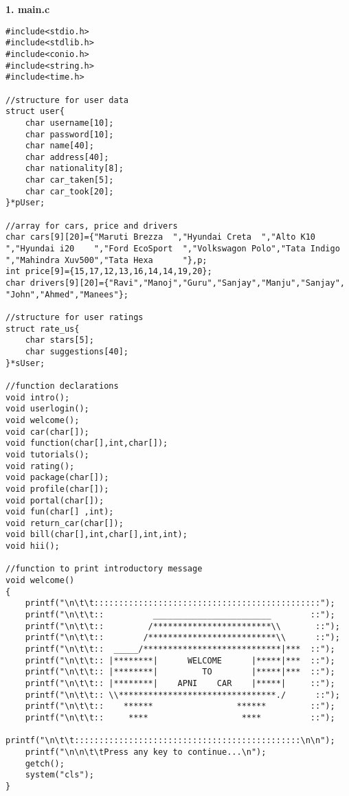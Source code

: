 \documentclass[12pt]{article}
\begin{document}
\noindent \textbf{1. main.c}


\begin{lstlisting} 
#include<stdio.h>
#include<stdlib.h>
#include<conio.h>
#include<string.h>
#include<time.h>

//structure for user data
struct user{
    char username[10];
    char password[10];
    char name[40];
    char address[40];
    char nationality[8];
    char car_taken[5];
    char car_took[20];
}*pUser;

//array for cars, price and drivers
char cars[9][20]={"Maruti Brezza  ","Hyundai Creta  ","Alto K10       ","Hyundai i20    ","Ford EcoSport  ","Volkswagon Polo","Tata Indigo    ","Mahindra Xuv500","Tata Hexa      "},p;
int price[9]={15,17,12,13,16,14,14,19,20};
char drivers[9][20]={"Ravi","Manoj","Guru","Sanjay","Manju","Sanjay",
"John","Ahmed","Manees"};

//structure for user ratings
struct rate_us{
    char stars[5];
    char suggestions[40];
}*sUser;

//function declarations
void intro();
void userlogin();
void welcome();
void car(char[]);
void function(char[],int,char[]);
void tutorials();
void rating();
void package(char[]);
void profile(char[]);
void portal(char[]);
void fun(char[] ,int);
void return_car(char[]);
void bill(char[],int,char[],int,int);
void hii();

//function to print introductory message
void welcome()
{
	printf("\n\t\t::::::::::::::::::::::::::::::::::::::::::::::");
   	printf("\n\t\t::          ________________________        ::");
   	printf("\n\t\t::         /************************\\       ::");
   	printf("\n\t\t::        /**************************\\      ::");
   	printf("\n\t\t::  _____/****************************|***  ::");
   	printf("\n\t\t:: |********|      WELCOME      |*****|***  ::");
   	printf("\n\t\t:: |********|         TO        |*****|***  ::");
   	printf("\n\t\t:: |********|    APNI    CAR    |*****|     ::");
   	printf("\n\t\t:: \\********************************./      ::");
   	printf("\n\t\t::    ******                 ******         ::");
   	printf("\n\t\t::     ****                   ****          ::");
   	printf("\n\t\t::::::::::::::::::::::::::::::::::::::::::::::\n\n");
   	printf("\n\n\t\tPress any key to continue...\n");
   	getch();
   	system("cls");
}


\end{lstlisting}
\end{document}
